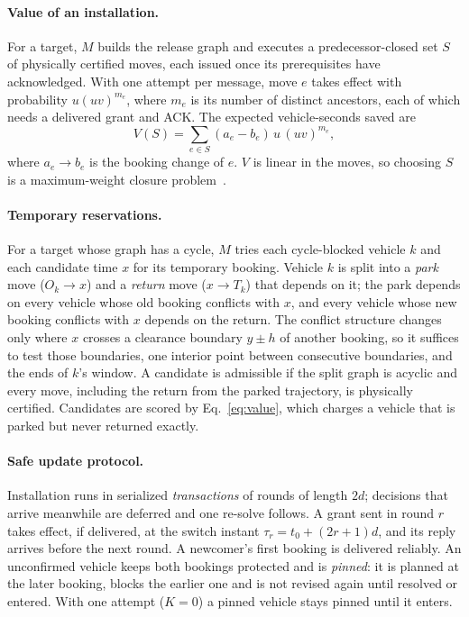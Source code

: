 \documentclass[10pt]{article}
\begin{document}
\paragraph{Value of an installation.} For a target, $M$ builds the release graph and executes a predecessor-closed set $S$ of physically certified moves, each issued once its prerequisites have acknowledged. With one attempt per message, move $e$ takes effect with probability $u(uv)^{m_e}$, where $m_e$ is its number of distinct ancestors, each of which needs a delivered grant and ACK. The expected vehicle-seconds saved are
\begin{equation}
V(S)=\textstyle\sum_{e\in S}(a_e-b_e)\,u\,(uv)^{m_e}, \label{eq:value}
\end{equation}
where $a_e\to b_e$ is the booking change of $e$. $V$ is linear in the moves, so choosing $S$ is a maximum-weight closure problem~\cite{picard1976}.

\paragraph{Temporary reservations.} For a target whose graph has a cycle, $M$ tries each cycle-blocked vehicle $k$ and each candidate time $x$ for its temporary booking. Vehicle $k$ is split into a \emph{park} move ($O_k\to x$) and a \emph{return} move ($x\to T_k$) that depends on it; the park depends on every vehicle whose old booking conflicts with $x$, and every vehicle whose new booking conflicts with $x$ depends on the return. The conflict structure changes only where $x$ crosses a clearance boundary $y\pm h$ of another booking, so it suffices to test those boundaries, one interior point between consecutive boundaries, and the ends of $k$'s window. A candidate is admissible if the split graph is acyclic and every move, including the return from the parked trajectory, is physically certified. Candidates are scored by Eq.~\eqref{eq:value}, which charges a vehicle that is parked but never returned exactly.

\paragraph{Safe update protocol.} Installation runs in serialized \emph{transactions} of rounds of length $2d$; decisions that arrive meanwhile are deferred and one re-solve follows. A grant sent in round $r$ takes effect, if delivered, at the switch instant $\tau_r=t_0+(2r+1)d$, and its reply arrives before the next round. A newcomer's first booking is delivered reliably. An unconfirmed vehicle keeps both bookings protected and is \emph{pinned}: it is planned at the later booking, blocks the earlier one and is not revised again until resolved or entered. With one attempt ($K=0$) a pinned vehicle stays pinned until it enters.
\end{document}
